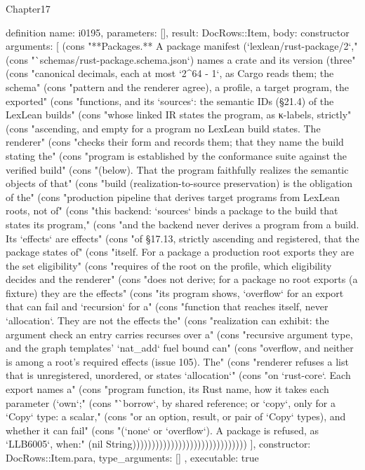 \begin{lexlean}{Chapter17}
\begin{semanticmodule}
definition{
  name: i0195,
  parameters: [],
  result: DocRows::Item,
  body: constructor{
    arguments: [
      (cons "**Packages.** A package manifest (`lexlean/rust-package/2`," (cons "`schemas/rust-package.schema.json`) names a crate and its version (three" (cons "canonical decimals, each at most `2^64 - 1`, as Cargo reads them; the schema" (cons "pattern and the renderer agree), a profile, a target program, the exported" (cons "functions, and its `sources`: the semantic IDs (§21.4) of the LexLean builds" (cons "whose linked IR states the program, as κ-labels, strictly" (cons "ascending, and empty for a program no LexLean build states. The renderer" (cons "checks their form and records them; that they name the build stating the" (cons "program is established by the conformance suite against the verified build" (cons "(below). That the program faithfully realizes the semantic objects of that" (cons "build (realization-to-source preservation) is the obligation of the" (cons "production pipeline that derives target programs from LexLean roots, not of" (cons "this backend: `sources` binds a package to the build that states its program," (cons "and the backend never derives a program from a build. Its `effects` are effects" (cons "of §17.13, strictly ascending and registered, that the package states of" (cons "itself. For a package a production root exports they are the set eligibility" (cons "requires of the root on the profile, which eligibility decides and the renderer" (cons "does not derive; for a package no root exports (a fixture) they are the effects" (cons "its program shows, `overflow` for an export that can fail and `recursion` for a" (cons "function that reaches itself, never `allocation`. They are not the effects the" (cons "realization can exhibit: the argument check an entry carries recurses over a" (cons "recursive argument type, and the graph templates' `nat_add` fuel bound can" (cons "overflow, and neither is among a root's required effects (issue 105). The" (cons "renderer refuses a list that is unregistered, unordered, or states `allocation`" (cons "on `rust-core`. Each export names a" (cons "program function, its Rust name, how it takes each parameter (`own`;" (cons "`borrow`, by shared reference; or `copy`, only for a `Copy` type: a scalar," (cons "or an option, result, or pair of `Copy` types), and whether it can fail" (cons "(`none` or `overflow`). A package is refused, as `LLB6005`, when:" (nil String))))))))))))))))))))))))))))))
    ],
    constructor: DocRows::Item.para,
    type_arguments: []
  },
  executable: true
}


\end{semanticmodule}
\end{lexlean}
